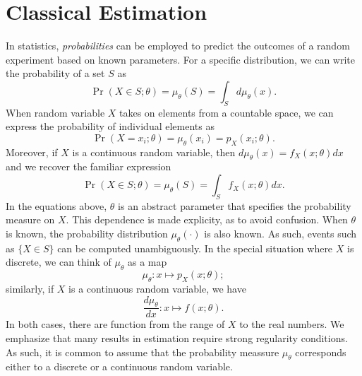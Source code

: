 \chapter{Classical Estimation}


In statistics, \emph{probabilities} can be employed to predict the outcomes of a random experiment based on known parameters.
For a specific distribution, we can write the probability of a set $S$ as
\begin{equation*}
\Pr (X \in S ; \theta) = \mu_{\theta} (S) = \int_S d\mu_{\theta}(x) .
\end{equation*}
When random variable $X$ takes on elements from a countable space, we can express the probability of individual elements as
\begin{equation*}
\Pr (X = x_i; \theta) = \mu_{\theta} (x_i) = p_{X} (x_i ; \theta) .
\end{equation*}
Moreover, if $X$ is a continuous random variable, then $d\mu_{\theta} (x) = f_X (x ; \theta) dx$ and we recover the familiar expression
\begin{equation*}
\Pr (X \in S ; \theta) = \mu_{\theta} (S) = \int_{S} f_X (x; \theta) dx .
\end{equation*}
In the equations above, $\theta$ is an abstract parameter that specifies the probability measure on $X$.
This dependence is made explicity, as to avoid confusion.
When $\theta$ is known, the probability distribution $\mu_{\theta} (\cdot)$ is also known.
As such, events such as $\{ X \in S \}$ can be computed unambiguously.
In the special situation where $X$ is discrete, we can think of $\mu_{\theta}$ as a map
\begin{equation*}
\mu_{\theta} : x \mapsto p_X (x; \theta) ;
\end{equation*}
similarly, if $X$ is a continuous random variable, we have
\begin{equation*}
\frac{d \mu_{\theta}}{dx} : x \mapsto f(x; \theta) .
\end{equation*}
In both cases, there are function from the range of $X$ to the real numbers.
We emphasize that many results in estimation require strong regularity conditions.
As such, it is common to assume that the probability meassure $\mu_{\theta}$ corresponds either to a discrete or a continuous random variable.

